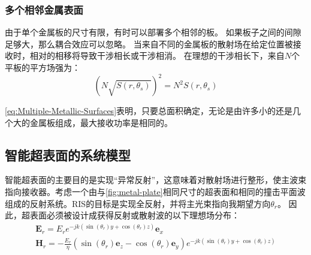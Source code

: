 \documentclass[supercite]{HustGraduPaper}
\begin{document}
\subsubsection{多个相邻金属表面}

由于单个金属板的尺寸有限，有时可以部署多个相邻的板。
如果板子之间的间隙足够大，那么耦合效应可以忽略。
当来自不同的金属板的散射场在给定位置被接收时，相对的相移将导致干涉相长或干涉相消。
在理想的干涉相长下，来自$N$个平板的平方场强为：
\begin{equation}
	\left(N \sqrt{S\left(r, \theta_{s}\right)}\right)^{2}=N^{2} S\left(r, \theta_{s}\right)
	\label{eq:Multiple-Metallic-Surfaces}
\end{equation}

\autoref{eq:Multiple-Metallic-Surfaces}表明，只要总面积确定，无论是由许多小的还是几个大的金属板组成，最大接收功率是相同的。

\subsection{智能超表面的系统模型}

智能超表面的主要目的是实现“异常反射”\cite{liang2015anomalous}，这意味着对散射场进行整形，使主波束指向接收器。考虑一个由与\autoref{fig:metal-plate}相同尺寸的超表面和相同的撞击平面波组成的反射系统。RIS的目标是实现全反射，并将主光束指向我期望方向$\theta_r$。
因此，超表面必须被设计成获得反射或散射波的以下理想场分布：
\begin{equation}
	\begin{array}{l}
		\mathbf{E}_{r}=E_{r} e^{-j k\left(\sin \left(\theta_{r}\right) y+\cos \left(\theta_{r}\right) z\right)} \boldsymbol{e}_{x} \\
		\mathbf{H}_{r}=-\frac{E_{r}}{\eta}\left(\sin \left(\theta_{r}\right) \boldsymbol{e}_{z}-\cos \left(\theta_{r}\right) \boldsymbol{e}_{y}\right) e^{-j k\left(\sin \left(\theta_{r}\right) y+\cos \left(\theta_{r}\right) z\right)}
	\end{array}
\end{equation}
\end{document}
